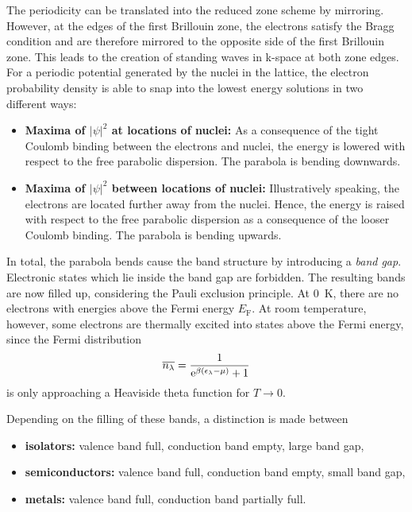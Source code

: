 The periodicity can be translated into the reduced zone scheme by mirroring.
However, at the edges of the first Brillouin zone, the electrons satisfy the Bragg condition and are therefore mirrored to the opposite side of the first Brillouin zone.
This leads to the creation of standing waves in k-space at both zone edges.
For a periodic potential generated by the nuclei in the lattice, the electron probability density is able to snap into the lowest energy solutions in two different ways:
\begin{itemize}
\item \textbf{Maxima of $|\psi|^2$ at locations of nuclei:} As a consequence of the tight Coulomb binding between the electrons and nuclei, the energy is lowered with respect to the free parabolic dispersion. The parabola is bending downwards.
	\item \textbf{Maxima of $|\psi|^2$ between locations of nuclei:} Illustratively speaking, the electrons are located further away from the nuclei. Hence, the energy is raised with respect to the free parabolic dispersion as a consequence of the looser Coulomb binding. The parabola is bending upwards.
\end{itemize}

In total, the parabola bends cause the band structure by introducing a \textit{band gap}.
Electronic states which lie inside the band gap are forbidden.
The resulting bands are now filled up, considering the Pauli exclusion principle.
At \SI{0}{\kelvin}, there are no electrons with energies above the Fermi energy $E_\text{F}$.
At room temperature, however, some electrons are thermally excited into states above the Fermi energy, since the Fermi distribution
\begin{equation*}
  \overline{n_\lambda} = \frac{1}{\mathrm{e}^{\beta\left(\epsilon_\lambda-\mu\right)} + 1}
\end{equation*}
is only approaching a Heaviside theta function for $T\rightarrow 0$.

Depending on the filling of these bands, a distinction is made between
\begin{itemize}
	\item \textbf{isolators:} valence band full, conduction band empty, large band gap,
	\item \textbf{semiconductors:} valence band full, conduction band empty, small band gap,
	\item \textbf{metals:} valence band full, conduction band partially full.
\end{itemize}

